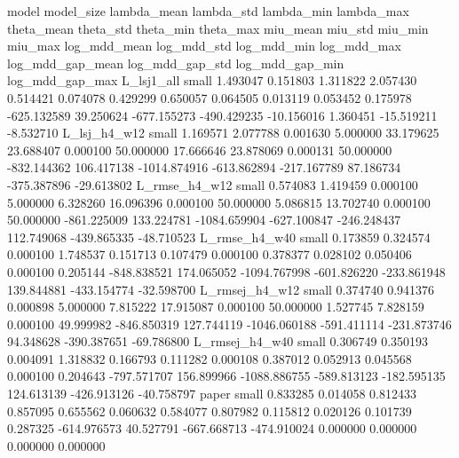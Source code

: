          model model_size  lambda_mean  lambda_std  lambda_min  lambda_max  theta_mean  theta_std  theta_min  theta_max  miu_mean   miu_std  miu_min   miu_max  log_mdd_mean  log_mdd_std  log_mdd_min  log_mdd_max  log_mdd_gap_mean  log_mdd_gap_std  log_mdd_gap_min  log_mdd_gap_max
    L_lsj1_all      small     1.493047    0.151803    1.311822    2.057430    0.514421   0.074078   0.429299   0.650057  0.064505  0.013119 0.053452  0.175978   -625.132589    39.250624  -677.155273  -490.429235        -10.156016         1.360451       -15.519211        -8.532710
  L_lsj_h4_w12      small     1.169571    2.077788    0.001630    5.000000   33.179625  23.688407   0.000100  50.000000 17.666646 23.878069 0.000131 50.000000   -832.144362   106.417138 -1014.874916  -613.862894       -217.167789        87.186734      -375.387896       -29.613802
 L_rmse_h4_w12      small     0.574083    1.419459    0.000100    5.000000    6.328260  16.096396   0.000100  50.000000  5.086815 13.702740 0.000100 50.000000   -861.225009   133.224781 -1084.659904  -627.100847       -246.248437       112.749068      -439.865335       -48.710523
 L_rmse_h4_w40      small     0.173859    0.324574    0.000100    1.748537    0.151713   0.107479   0.000100   0.378377  0.028102  0.050406 0.000100  0.205144   -848.838521   174.065052 -1094.767998  -601.826220       -233.861948       139.844881      -433.154774       -32.598700
L_rmsej_h4_w12      small     0.374740    0.941376    0.000898    5.000000    7.815222  17.915087   0.000100  50.000000  1.527745  7.828159 0.000100 49.999982   -846.850319   127.744119 -1046.060188  -591.411114       -231.873746        94.348628      -390.387651       -69.786800
L_rmsej_h4_w40      small     0.306749    0.350193    0.004091    1.318832    0.166793   0.111282   0.000108   0.387012  0.052913  0.045568 0.000100  0.204643   -797.571707   156.899966 -1088.886755  -589.813123       -182.595135       124.613139      -426.913126       -40.758797
         paper      small     0.833285    0.014058    0.812433    0.857095    0.655562   0.060632   0.584077   0.807982  0.115812  0.020126 0.101739  0.287325   -614.976573    40.527791  -667.668713  -474.910024          0.000000         0.000000         0.000000         0.000000